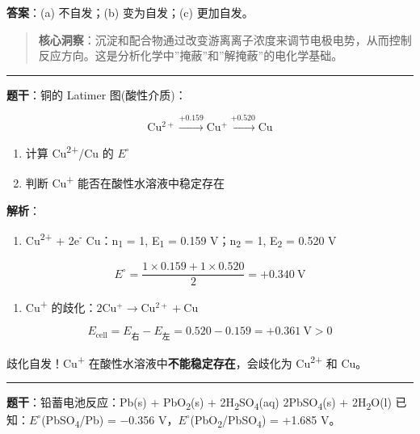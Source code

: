 \textbf{答案}：(a) 不自发；(b) 变为自发；(c) 更加自发。

\begin{quote}
\textbf{核心洞察}：沉淀和配合物通过改变游离离子浓度来调节电极电势，从而控制反应方向。这是分析化学中''掩蔽''和''解掩蔽''的电化学基础。
\end{quote}

\begin{center}\rule{0.5\linewidth}{0.5pt}\end{center}

\textbf{题干}：铜的 Latimer 图(酸性介质)：

\[\mathrm{Cu^{2+}} \xrightarrow{+0.159} \mathrm{Cu^+} \xrightarrow{+0.520} \mathrm{Cu}\]

\begin{enumerate}
\def\labelenumi{(\alph{enumi})}
\tightlist
\item
  计算 Cu\textsuperscript{2+}/Cu 的 \(E^{\circ}\)
\item
  判断 Cu\textsuperscript{+} 能否在酸性水溶液中稳定存在
\end{enumerate}

\textbf{解析}：

\begin{enumerate}
\def\labelenumi{(\alph{enumi})}
\tightlist
\item
  Cu\textsuperscript{2+} + 2e\textsuperscript{-} \箭 Cu：n\textsubscript{1} = 1, E\textsubscript{1} = 0.159 V；n\textsubscript{2} = 1, E\textsubscript{2} = 0.520 V
\end{enumerate}

\[E^\circ = \frac{1 \times 0.159 + 1 \times 0.520}{2} = +0.340\ \mathrm{V}\]

\begin{enumerate}
\def\labelenumi{(\alph{enumi})}
\setcounter{enumi}{1}
\tightlist
\item
  Cu\textsuperscript{+} 的歧化：\(2\mathrm{Cu^+ \to Cu^{2+} + Cu}\)
\end{enumerate}

\[E_{\text{cell}} = E_{\text{右}} - E_{\text{左}} = 0.520 - 0.159 = +0.361\ \mathrm{V} > 0\]

歧化自发！Cu\textsuperscript{+} 在酸性水溶液中\textbf{不能稳定存在}，会歧化为 Cu\textsuperscript{2+} 和 Cu。

\begin{center}\rule{0.5\linewidth}{0.5pt}\end{center}

\textbf{题干}：铅蓄电池反应：Pb(s) + PbO\textsubscript{2}(s) + 2H\textsubscript{2}SO\textsubscript{4}(aq) \衡 2PbSO\textsubscript{4}(s) + 2H\textsubscript{2}O(l)
已知：\(E^{\circ}\)(PbSO\textsubscript{4}/Pb) = −0.356 V，\(E^{\circ}\)(PbO\textsubscript{2}/PbSO\textsubscript{4}) = +1.685 V。

